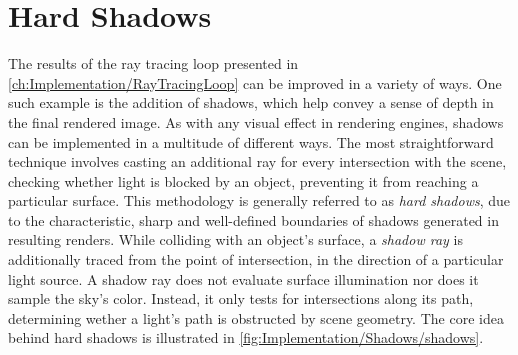 \section{Hard Shadows}

The results of the ray tracing loop presented in \cref{ch:Implementation/RayTracingLoop} can be improved in a variety of ways.
One such example is the addition of shadows, which help convey a sense of depth in the final rendered image.
As with any visual effect in rendering engines, shadows can be implemented in a multitude of different ways.
The most straightforward technique involves casting an additional ray for every intersection with the scene, checking whether light is blocked by an object, preventing it from reaching a particular surface.
This methodology is generally referred to as \textit{hard shadows}, due to the characteristic, sharp and well-defined boundaries of shadows generated in resulting renders.
While colliding with an object's surface, a \textit{shadow ray} is additionally traced from the point of intersection, in the direction of a particular light source.
A shadow ray does not evaluate surface illumination nor does it sample the sky's color.
Instead, it only tests for intersections along its path, determining wether a light's path is obstructed by scene geometry.
The core idea behind hard shadows is illustrated in \cref{fig:Implementation/Shadows/shadows}.

